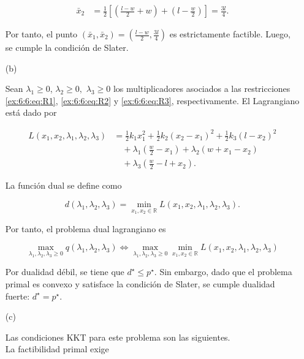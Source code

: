 \begin{enumerate}
\begin{align}
\bar{x}_2
&=
\frac{1}{2}
\left[
\left(
\frac{l-w}{2}+w
\right)
+
\left(
l-\frac{w}{2}
\right)
\right]=
\frac{3l}{4}.
\end{align}

Por tanto, el punto $(\bar{x}_1,\bar{x}_2)
=\left(\frac{l-w}{2},\frac{3l}{4}\right)$ es estrictamente factible. Luego, se cumple la condición de Slater.

  \item[(b)]

Sean $\lambda_1\geq 0$, $\lambda_2\geq 0,$ $\lambda_3\geq 0$ los multiplicadores asociados a las restricciones \eqref{ex:6:6:eq:R1}, \eqref{ex:6:6:eq:R2} y \eqref{ex:6:6:eq:R3}, respectivamente. El Lagrangiano está dado por

\begin{align}
L(x_1,x_2,\lambda_1,\lambda_2,\lambda_3)
&=
\frac{1}{2}k_1x_1^2
+
\frac{1}{2}k_2(x_2-x_1)^2
+
\frac{1}{2}k_3(l-x_2)^2\\
&\quad+
\lambda_1
\left(
\frac{w}{2}-x_1
\right)
+
\lambda_2
\left(
w+x_1-x_2
\right)\\
&\quad+
\lambda_3
\left(
\frac{w}{2}-l+x_2
\right).
\end{align}

La función dual se define como

\begin{equation}
d(\lambda_1,\lambda_2,\lambda_3)
=
\min_{x_1,x_2\in\mathbb{R}}
L(x_1,x_2,\lambda_1,\lambda_2,\lambda_3).
\end{equation}

Por tanto, el problema dual lagrangiano es

\begin{equation}
\max_{\lambda_1,\lambda_2,\lambda_3\geq0}
q(\lambda_1,\lambda_2,\lambda_3) \Leftrightarrow
\max_{\lambda_1,\lambda_2,\lambda_3\geq0}\min_{x_1,x_2\in\mathbb{R}}
L(x_1,x_2,\lambda_1,\lambda_2,\lambda_3)
\end{equation}

Por dualidad débil, se tiene que $d^\star\leq p^\star.$ Sin embargo, dado que el problema primal es convexo y satisface la condición de Slater, se cumple dualidad fuerte: $d^\star=p^\star.$

  \item[(c)]

Las condiciones KKT para este problema son las siguientes.\\

La factibilidad primal exige


\end{enumerate}
